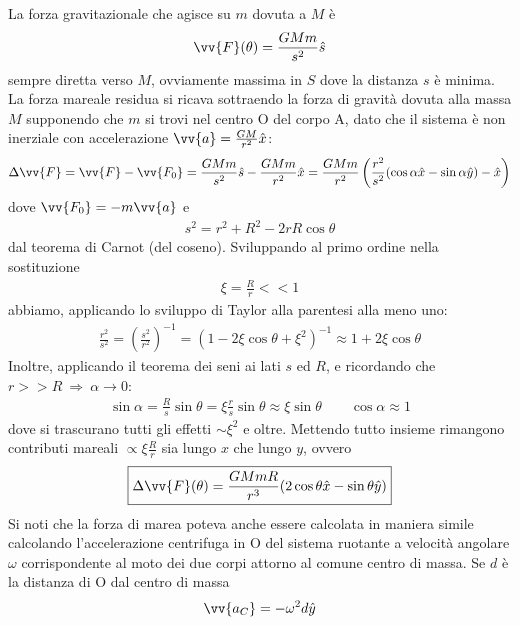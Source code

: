 \documentclass[a4paper, oneside]{book}
\begin{document}
La forza gravitazionale che agisce su $m$ dovuta a $M$ è 
\begin{gather*}
    \vv{F}(\theta) = \frac{GMm}{s^{2}} \hat{s}  
\end{gather*}
sempre diretta verso $M$, ovviamente massima in $S$ dove la distanza $s$ è minima. 
La forza mareale residua si ricava sottraendo la forza di gravità dovuta alla massa $M$
supponendo che $m$ si trovi nel centro O del corpo A, dato che il sistema è non inerziale
con accelerazione $\vv{a} = \frac{GM}{r^{2}}\hat{x}$:
\begin{gather*}
    \Delta \vv{F} = \vv{F} - \vv{F_0} = \frac{GMm}{s^{2}}\hat{s} - \frac{GMm}{r^{2}} \hat{x} = \frac{GMm}{r^{2}} \left(\frac{r^{2}}{s^{2}}(\cos\alpha \hat{x} - \sin\alpha \hat{y}  ) - \hat{x} \right)     
\end{gather*}  
dove $\vv{F_0} = -m\vv{a}$ e
\begin{gather*}
    s^{2} = r^{2} + R^{2} - 2rR\cos\theta 
\end{gather*}  
dal teorema di Carnot (del coseno). Sviluppando al primo ordine nella sostituzione
\begin{gather*}
    \xi = \frac{R}{r} << 1
\end{gather*}
abbiamo, applicando lo sviluppo di Taylor alla parentesi alla meno uno:
\begin{gather*}
    \frac{r^{2}}{s^{2}} = \left(\frac{s^{2}}{r^{2}}\right)^{-1} = (1 -2\xi\cos\theta + \xi^{2})^{-1} \approx 1 + 2\xi\cos\theta
\end{gather*}
Inoltre, applicando il teorema dei seni ai lati $s$ ed $R$, e ricordando che $r >> R \ \Longrightarrow \ \alpha \to 0$:
\begin{gather*}
    \sin\alpha= \frac{R}{s} \sin\theta = \xi \frac{r}{s}\sin\theta \approx \xi\sin\theta \qquad \cos\alpha \approx 1
\end{gather*}
dove si trascurano tutti gli effetti $\sim\xi^{2}$ e oltre. 
Mettendo tutto insieme rimangono contributi mareali $\propto \xi \frac{R}{r}$
sia lungo $x$ che lungo $y$, ovvero 
\begin{align}
    \boxed{\Delta \vv{F}(\theta) = \frac{GMmR}{r^{3}}(2\cos\theta \hat{x} - \sin\theta \hat{y}   )}
\end{align}
Si noti che la forza di marea poteva anche essere calcolata in maniera simile 
calcolando l'accelerazione centrifuga in O del sistema ruotante a velocità angolare 
$\omega$ corrispondente al moto dei due corpi attorno al comune centro di massa.
Se $d$ è la distanza di O dal centro di massa 
\begin{gather*}
    \vv{a_C} = -\omega^{2}d \hat{y}   
\end{gather*}
\end{document}
